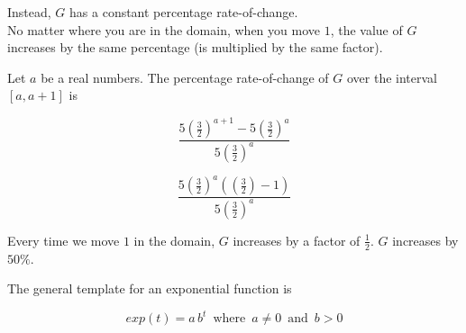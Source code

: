 \documentclass{ximera}
\begin{document}
Instead, $G$ has a constant percentage rate-of-change. \\

No matter where you are in the domain, when you move $1$, the value of $G$ increases by the same percentage (is multiplied by the same factor).


Let $a$ be a real numbers.  The percentage rate-of-change of $G$ over the interval $[a,a+1]$ is 



\[    \frac{5 \left(\frac{3}{2}\right)^{a+1} - 5 \left(\frac{3}{2}\right)^a}{5 \left(\frac{3}{2}\right)^a}       \]


\[   \frac{5 \left(\frac{3}{2}\right)^a (\left(\frac{3}{2}\right) - 1) }{5 \left(\frac{3}{2}\right)^a}    \]


Every time we move $1$ in the domain, $G$ increases by a factor of $\frac{1}{2}$.  $G$ increases by $50\%$.





The general template for an exponential function is 

\[   exp(t) = a \, b^t   \, \text{ where } \,  a \ne 0  \, \text{ and } \,    b > 0   \]
\end{document}
